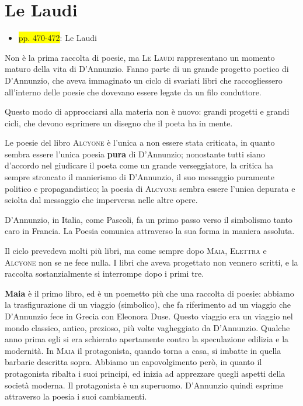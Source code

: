 \documentclass{book}
\newcommand{\pagine}[1]{\colorbox{yellow}{#1}}
\begin{document}
\section{Le Laudi}

\begin{itemize}

\item
  \pagine{pp. 470-472}: Le Laudi
\end{itemize}

Non è la prima raccolta di poesie, ma \textsc{Le Laudi} rappresentano un
momento maturo della vita di D'Annunzio. Fanno parte di un grande
progetto poetico di D'Annunzio, che aveva immaginato un ciclo di
svariati libri che raccogliessero all'interno delle poesie che dovevano
essere legate da un filo conduttore.

Questo modo di approcciarsi alla materia non è nuovo: grandi progetti e
grandi cicli, che devono esprimere un disegno che il poeta ha in mente.

Le poesie del libro \textsc{Alcyone} è l'unica a non essere stata
criticata, in quanto sembra essere l'unica poesia \textbf{pura} di
D'Annunzio; nonostante tutti siano d'accordo nel giudicare il poeta come
un grande verseggiatore, la critica ha sempre stroncato il manierismo di
D'Annunzio, il suo messaggio puramente politico e propagandistico; la
poesia di \textsc{Alcyone} sembra essere l'unica depurata e sciolta dal
messaggio che imperversa nelle altre opere.

D'Annunzio, in Italia, come Pascoli, fa un primo passo verso il
simbolismo tanto caro in Francia. La Poesia comunica attraverso la sua
forma in maniera assoluta.

Il ciclo prevedeva molti più libri, ma come sempre dopo \textsc{Maia},
\textsc{Elettra} e \textsc{Alcyone} non se ne fece nulla. I libri che aveva
progettato non vennero scritti, e la raccolta sostanzialmente si
interrompe dopo i primi tre.

\textbf{Maia} è il primo libro, ed è un poemetto più che una raccolta di
poesie: abbiamo la trasfigurazione di un viaggio (simbolico), che fa
riferimento ad un viaggio che D'Annunzio fece in Grecia con Eleonora
Duse. Questo viaggio era un viaggio nel mondo classico, antico,
prezioso, più volte vagheggiato da D'Annunzio. Qualche anno prima egli
si era schierato apertamente contro la speculazione edilizia e la
modernità. In \textsc{Maia} il protagonista, quando torna a casa, si
imbatte in quella barbarie descritta sopra. Abbiamo un capovolgimento
però, in quanto il protagonista ribalta i suoi principi, ed inizia ad
apprezzare quegli aspetti della società moderna. Il protagonista è un
superuomo. D'Annunzio quindi esprime attraverso la poesia i suoi
cambiamenti.
\end{document}
